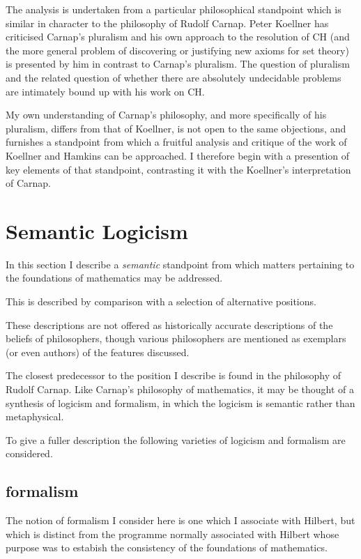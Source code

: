 \documentclass[10pt,titlepage]{article}
\begin{document}
The analysis is undertaken from a particular philosophical standpoint which is similar in character to the philosophy of Rudolf Carnap.
Peter Koellner has criticised Carnap's pluralism and his own approach to the resolution of CH (and the more general problem of discovering or justifying new axioms for set theory) is presented by him in contrast to Carnap's pluralism.
The question of pluralism and the related question of whether there are absolutely undecidable problems are intimately bound up with his work on CH.

My own understanding of Carnap's philosophy, and more specifically of his pluralism, differs from that of Koellner, is not open to the same objections, and furnishes a standpoint from which a fruitful analysis and critique of the work of Koellner and Hamkins can be approached.
I therefore begin with a presention of key elements of that standpoint, contrasting it with the Koellner's interpretation of Carnap.

\section{Semantic Logicism}

In this section I describe a \emph{semantic} standpoint from which matters pertaining to the foundations of mathematics may be addressed.

This is described by comparison with a selection of alternative positions.

These descriptions are not offered as historically accurate descriptions of the beliefs of philosophers, though various philosophers are mentioned as exemplars (or even authors) of the features discussed.

The closest predecessor to the position I describe is found in the philosophy of Rudolf Carnap.
Like Carnap's philosophy of mathematics, it may be thought of a synthesis of logicism and formalism, in which the logicism is semantic rather than metaphysical.

To give a fuller description the following varieties of logicism and formalism are considered.

\subsection{formalism}

The notion of formalism I consider here is one which I associate with Hilbert, but which is distinct from the programme normally associated with Hilbert whose purpose was to estabish the consistency of the foundations of mathematics.
\end{document}
